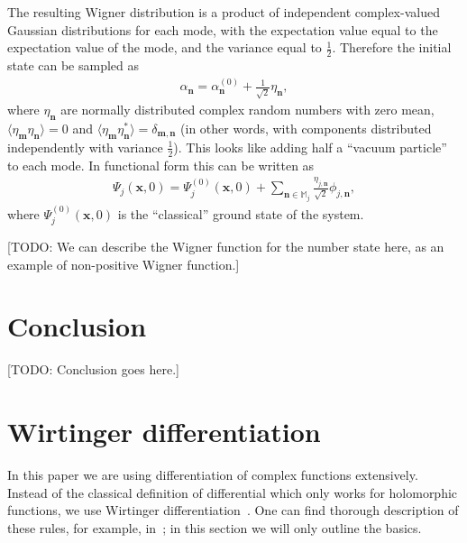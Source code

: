 \documentclass[12pt,aip,jmp,amssymb,amsmath]{revtex4-1}
\begin{document}
The resulting Wigner distribution is a product of independent complex-valued Gaussian distributions for each mode,
with the expectation value equal to the expectation value of the mode,
and the variance equal to $\frac{1}{2}$.
Therefore the initial state can be sampled as
\begin{eqnarray}
    \alpha_{\boldsymbol{n}} = \alpha_{\boldsymbol{n}}^{(0)} + \frac{1}{\sqrt{2}} \eta_{\boldsymbol{n}},
\end{eqnarray}
where $\eta_{\boldsymbol{n}}$ are normally distributed complex random numbers with zero mean,
$\langle \eta_{\boldsymbol{m}} \eta_{\boldsymbol{n}} \rangle = 0$ and
$\langle \eta_{\boldsymbol{m}} \eta_{\boldsymbol{n}}^* \rangle = \delta_{\boldsymbol{m},\boldsymbol{n}}$
(in other words, with components distributed independently with variance $\frac{1}{2}$).
This looks like adding half a ``vacuum particle'' to each mode.
In functional form this can be written as
\begin{eqnarray}
    \Psi_j(\boldsymbol{x}, 0)
    = \Psi_j^{(0)}(\boldsymbol{x}, 0)
        + \sum_{\boldsymbol{n} \in \mathbb{M}_j} \frac{\eta_{j,\boldsymbol{n}}}{\sqrt{2}} \phi_{j,\boldsymbol{n}},
\end{eqnarray}
where $\Psi_j^{(0)}(\boldsymbol{x}, 0)$ is the ``classical'' ground state of the system.

[TODO: We can describe the Wigner function for the number state here, as an example of non-positive Wigner function.]



\section{Conclusion}

[TODO: Conclusion goes here.]


\appendix



\section{Wirtinger differentiation}

In this paper we are using differentiation of complex functions extensively.
Instead of the classical definition of differential which only works for holomorphic functions, we use Wirtinger differentiation~\cite{Wirtinger1927}.
One can find thorough description of these rules, for example, in~\cite{Kreutz-Delgado2009}; in this section we will only outline the basics.
\end{document}
